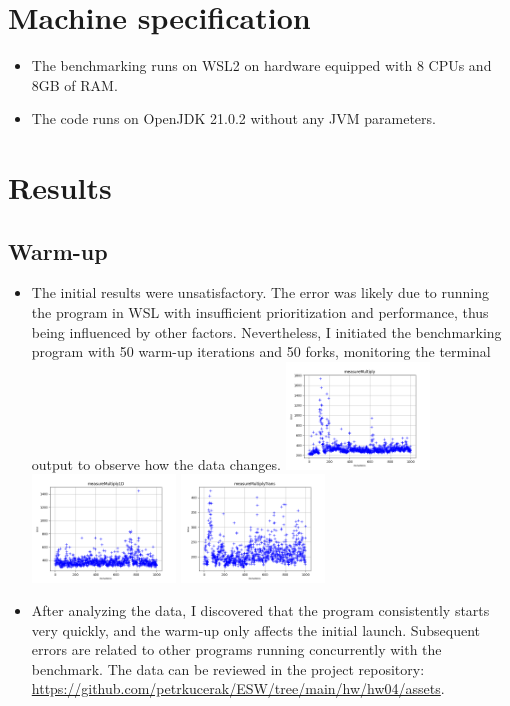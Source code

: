 \documentclass[onecolumn, conference]{IEEEtran}
\newcommand{\conciseItem}{\itemsep1pt \parskip0pt \parsep0pt}
\begin{document}
\section{Machine specification}
\begin{itemize}
	\conciseItem
	\item The benchmarking runs on WSL2 on hardware equipped with 8 CPUs and 8GB of RAM.
	\item The code runs on OpenJDK 21.0.2 without any JVM parameters.
\end{itemize}
\section{Results}
\subsection{Warm-up}
\begin{itemize}
	\conciseItem
	\item The initial results were unsatisfactory. The error was likely due to running the program in WSL with insufficient prioritization and performance, thus being influenced by other factors. Nevertheless, I initiated the benchmarking program with 50 warm-up iterations and 50 forks, monitoring the terminal output to observe how the data changes.
	\includegraphics[width=0.3\textwidth]{warmup_measureMultiply.png}
	\includegraphics[width=0.3\textwidth]{warmup_measureMultiply1D.png}
	\includegraphics[width=0.3\textwidth]{warmup_measureMultiplyTrans.png}
	\item After analyzing the data, I discovered that the program consistently starts very quickly, and the warm-up only affects the initial launch. Subsequent errors are related to other programs running concurrently with the benchmark. The data can be reviewed in the project repository: \url{https://github.com/petrkucerak/ESW/tree/main/hw/hw04/assets}.
\end{itemize}
\end{document}
